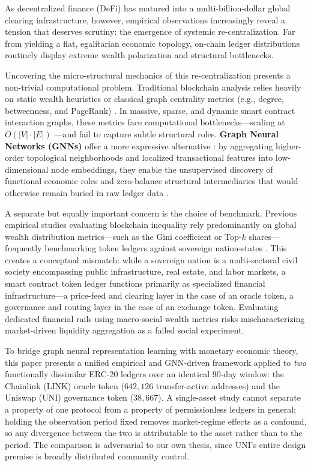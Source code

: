 \documentclass[final,5p,times]{elsarticle}
\begin{document}
As decentralized finance (DeFi) has matured into a multi-billion-dollar global clearing infrastructure, however, empirical observations increasingly reveal a tension that deserves scrutiny: the emergence of systemic re-centralization. Far from yielding a flat, egalitarian economic topology, on-chain ledger distributions routinely display extreme wealth polarization and structural bottlenecks.

Uncovering the micro-structural mechanics of this re-centralization presents a non-trivial computational problem. Traditional blockchain analysis relies heavily on static wealth heuristics or classical graph centrality metrics (e.g., degree, betweenness, and PageRank) \cite{meiklejohn2013fistful}. In massive, sparse, and dynamic smart contract interaction graphs, these metrics face computational bottlenecks---scaling at $O(|V| \cdot |E|)$ \cite{brandes2001faster}---and fail to capture subtle structural roles. \textbf{Graph Neural Networks (GNNs)} offer a more expressive alternative \cite{kipf2017semi, velickovic2018graph, hamilton2017inductive}: by aggregating higher-order topological neighborhoods and localized transactional features into low-dimensional node embeddings, they enable the unsupervised discovery of functional economic roles and zero-balance structural intermediaries that would otherwise remain buried in raw ledger data \cite{weber2019anti}.

A separate but equally important concern is the choice of benchmark. Previous empirical studies evaluating blockchain inequality rely predominantly on global wealth distribution metrics---such as the Gini coefficient or Top-$k$ shares---frequently benchmarking token ledgers against sovereign nation-states \cite{gudgeon2020defi, campajola2023evolution, zarir2021developing}. This creates a conceptual mismatch: while a sovereign nation is a multi-sectoral civil society encompassing public infrastructure, real estate, and labor markets, a smart contract token ledger functions primarily as specialized financial infrastructure---a price-feed and clearing layer in the case of an oracle token, a governance and routing layer in the case of an exchange token. Evaluating dedicated financial rails using macro-social wealth metrics risks mischaracterizing market-driven liquidity aggregation as a failed social experiment.

To bridge graph neural representation learning with monetary economic theory, this paper presents a unified empirical and GNN-driven framework applied to \emph{two} functionally dissimilar ERC-20 ledgers over an identical 90-day window: the Chainlink (LINK) oracle token ($642{,}126$ transfer-active addresses) and the Uniswap (UNI) governance token ($38{,}667$). A single-asset study cannot separate a property of one protocol from a property of permissionless ledgers in general; holding the observation period fixed removes market-regime effects as a confound, so any divergence between the two is attributable to the asset rather than to the period. The comparison is adversarial to our own thesis, since UNI's entire design premise is broadly distributed community control.
\end{document}
